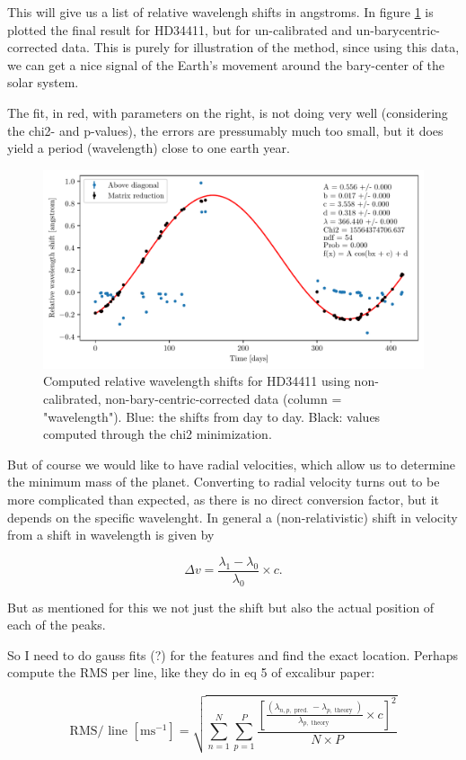     This will give us a list of relative wavelengh shifts in angstroms. In figure \ref{fig:shift_non_bary_centric} is plotted the final result for HD34411, but for un-calibrated and un-barycentric-corrected data. This is purely for illustration of the method, since using this data, we can get a nice signal of the Earth's movement around the bary-center of the solar system. 

    The fit, in red, with parameters on the right, is not doing very well (considering the chi2- and p-values), the errors are pressumably much too small, but it does yield a period (wavelength) close to one earth year.

    \begin{figure}[ht]
        \centering
        \includegraphics[scale=0.8]{figures/shift_non_bary_centric.pdf}
        \caption{Computed relative wavelength shifts for HD34411 using non-calibrated, non-bary-centric-corrected data (column = "wavelength"). Blue: the shifts from day to day. Black: values computed through the chi2 minimization.}
        \label{fig:shift_non_bary_centric}
    \end{figure}

    
    But of course we would like to have radial velocities, which allow us to determine the minimum mass of the planet.
    Converting to radial velocity turns out to be more complicated than expected, as there is no direct conversion factor, but it depends on the specific wavelenght. In general a (non-relativistic) shift in velocity from a shift in wavelength is given by

    \begin{equation}
        \label{eq:delta_velocity}
        \Delta v = \frac{\lambda_1 - \lambda_0}{\lambda_0} \times c.
    \end{equation}

    But as mentioned for this we not just the shift but also the actual position of each of the peaks. 

    \todo{} So I need to do gauss fits (?) for the features and find the exact location. Perhaps compute the RMS per line, like they do in eq 5 of excalibur paper:

    $$
        \mathrm{RMS} / \text { line }\left[\mathrm{m} \mathrm{s}^{-1}\right]=\sqrt{\sum_{n=1}^{N} \sum_{p=1}^{P} \frac{\left[\frac{\left(\lambda_{n, p, \text { pred. }}-\lambda_{p, \text { theory }}\right)}{\lambda_{p, \text { theory }}} \times c\right]^{2}}{N \times P}}
    $$




